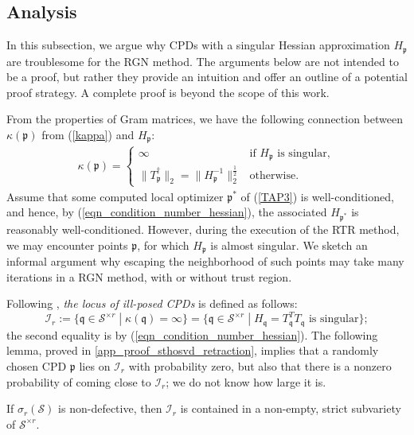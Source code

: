 \documentclass[a4paper,10pt,final]{siamart1116}
\newcommand{\tuple}[1]{\mathfrak{#1}}
\newcommand{\Var}[1]{\mathcal{#1}}
\newcommand{\Sec}[2]{\sigma_{#1}(#2)}
\newcommand{\refeqn}[1]{{(\ref{#1})}}
\newcommand{\refapp}[1]{{\cref{#1}}}
\numberwithin{equation}{section}
\numberwithin{figure}{section}
\numberwithin{table}{section}
\numberwithin{theorem}{section}
\begin{document}
\subsection{Analysis}\label{sec_ill_H_p}
In this subsection, we argue why CPDs with a singular Hessian approximation $H_{\tuple{p}}$ are troublesome for the RGN method. The arguments below are not intended to be a proof, but rather they provide an intuition and offer an outline of a potential proof strategy. A complete proof is beyond the scope of this work.

From the properties of Gram matrices, we have the following connection between $\kappa(\tuple{p})$ from \refeqn{kappa} and $H_{\tuple{p}}$:
\begin{align} \label{eqn_condition_number_hessian}
\kappa(\tuple{p}) =
\begin{cases}
 \infty & \text{if } H_{\tuple{p}} \text{ is singular}, \\
 \| T_{\tuple{p}}^\dagger \|_2 = \| H_{\tuple{p}}^{-1} \|_2^{\frac{1}{2}} & \text{otherwise}.
\end{cases}
\end{align}
Assume that some computed local optimizer $\tuple{p}^*$ of \refeqn{TAP3} is well-conditioned, and hence, by \refeqn{eqn_condition_number_hessian}, the associated $H_{\tuple{p}^*}$ is reasonably well-conditioned. However,
during the execution of the RTR method, we may encounter points $\tuple{p}$, for which $H_{\tuple{p}}$ is almost singular. We sketch an informal argument why escaping the neighborhood of such points may take many iterations in a RGN method, with or without trust region.

Following \cite[equation (2.3)]{BV2017}, \emph{the locus of ill-posed CPDs} is defined as follows:
\[
\Var{I}_r := \{ \tuple{q} \in \Var{S}^{\times r} \;|\; \kappa(\tuple{q}) = \infty \} = \{ \tuple{q} \in \Var{S}^{\times r} \;|\; H_{\tuple{q}}=T_{\tuple{q}}^TT_{\tuple{q}} \text{ is singular} \};
\]
the second equality is by \refeqn{eqn_condition_number_hessian}. The following lemma, proved in \refapp{app_proof_sthosvd_retraction}, implies that a randomly chosen CPD $\tuple{p}$ lies on $\Var I_r$ with probability zero, but also that
there is a nonzero probability of coming close to $\Var I_r$; we do not know how large it is.

\begin{lemma}\label{prop_I_r}
If $\Sec{r}{\Var{S}}$ is non-defective, then $\Var I_r$ is contained in a non-empty, strict  subvariety of $\Var S^{\times r}$.
\end{lemma}
\end{document}
